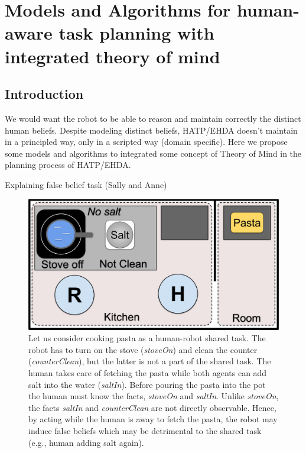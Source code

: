 \ifdefined{}
\else
\setcounter{chapter}{2} %
\dominitoc
\faketableofcontents
\fi

\chapter{Models and Algorithms for human-aware task planning with integrated theory of mind}
\label{chap:3}
\minitoc


\section{Introduction}

We would want the robot to be able to reason and maintain correctly the distinct human beliefs. Despite modeling distinct beliefs, HATP/EHDA doesn't maintain in a principled way, only in a scripted way (domain specific). Here we propose some models and algorithms to integrated some concept of Theory of Mind in the planning process of HATP/EHDA. 

Explaining false belief task (Sally and Anne)

\begin{figure}[t!]
    \centering
    \includegraphics[width=0.70\linewidth]{images/Chapter3/cooking_task_draw.png}
    \caption{
    Let us consider cooking pasta as a human-robot shared task. 
    The robot has to turn on the stove (\textit{stoveOn}) and clean the counter (\textit{counterClean}), but the latter is not a part of the shared task. The human takes care of fetching the pasta while both agents can add salt into the water (\textit{saltIn}). Before pouring the pasta into the pot the human must know the facts, \textit{stoveOn} and \textit{saltIn}. 
    Unlike \textit{stoveOn}, the facts \textit{saltIn} and \textit{counterClean} are not directly observable. 
    Hence, by acting while the human is away to fetch the pasta, the robot may induce false beliefs which may be detrimental to the shared task (e.g., human adding salt again).
    }
    \label{fig:new_scene}
\end{figure}


